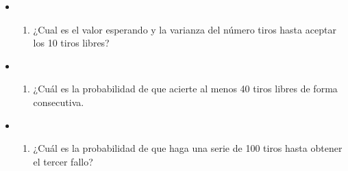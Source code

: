 \documentclass[
]{article}
\providecommand{\tightlist}{%
  \setlength{\itemsep}{0pt}\setlength{\parskip}{0pt}}
\begin{document}
\begin{itemize}
\item
  \begin{enumerate}
  \def\labelenumi{\alph{enumi})}
  \tightlist
  \item
    ¿Cual es el valor esperando y la varianza del número tiros hasta
    aceptar los 10 tiros libres?
  \end{enumerate}
\item
  \begin{enumerate}
  \def\labelenumi{\alph{enumi})}
  \setcounter{enumi}{1}
  \tightlist
  \item
    ¿Cuál es la probabilidad de que acierte al menos 40 tiros libres de
    forma consecutiva.
  \end{enumerate}
\item
  \begin{enumerate}
  \def\labelenumi{\alph{enumi})}
  \setcounter{enumi}{2}
  \tightlist
  \item
    ¿Cuál es la probabilidad de que haga una serie de 100 tiros hasta
    obtener el tercer fallo?
  \end{enumerate}
\end{itemize}
\end{document}
